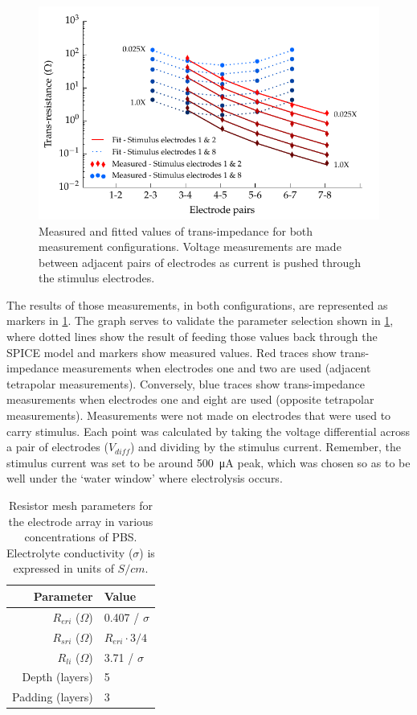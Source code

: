       \begin{figure}
        \centering
        \includegraphics{content/pt2/07-InterfaceModel/graphics/graph_transimpedance_pbs}
        \caption{\label{fig:pt2-graph_transimpedance_pbs}Measured and fitted values of trans-impedance for both measurement configurations. Voltage measurements are made between adjacent pairs of electrodes as current is pushed through the stimulus electrodes.}
      \end{figure}
      The results of those measurements, in both configurations, are represented as markers in \cref{fig:pt2-graph_transimpedance_pbs}.
      The graph serves to validate the parameter selection shown in \cref{tab:RESparams}, where dotted lines show the result of feeding those values back through the SPICE model and markers show measured values.
      Red traces show trans-impedance measurements when electrodes one and two are used (adjacent tetrapolar measurements).
      Conversely, blue traces show trans-impedance measurements when electrodes one and eight are used (opposite tetrapolar measurements).
      Measurements were not made on electrodes that were used to carry stimulus.
      Each point was calculated by taking the voltage differential across a pair of electrodes ($V_{diff}$) and dividing by the stimulus current.
      Remember, the stimulus current was set to be around \SI{500}{\micro\ampere} peak, which was chosen so as to be well under the `water window' where electrolysis occurs.
      \begin{table}
        \centering
        \begin{tabular}{r | l}
          Parameter & Value \\
          \hline
          $R_{eri}$ ($\Omega$)& 0.407 / $\sigma$\\
          $R_{sri}$ ($\Omega$)& $R_{eri}\cdot 3/4$\\
          $R_{li}$ ($\Omega$)& 3.71 / $\sigma$ \\
          Depth (layers) & 5 \\
          Padding (layers) & 3 \\
        \end{tabular}
        \caption{\label{tab:RESparams}Resistor mesh parameters for the electrode array in various concentrations of PBS. Electrolyte conductivity ($\sigma$) is expressed in units of $S / cm$.}
      \end{table}


